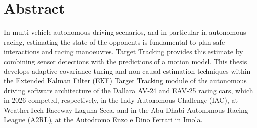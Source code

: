 \documentclass{Configuration_Files/PoliMi3i_thesis}
\begin{document}


\pagestyle{empty} %
\hypersetup{pageanchor=false} %
\frontmatter %


\startpreamble
\hypersetup{pageanchor=true}
\setcounter{page}{1} %

\chapter*{Abstract}
\begingroup\setlength{\parskip}{4pt}%

In multi-vehicle autonomous driving scenarios, and in particular in autonomous racing, estimating the state of the opponents is fundamental to plan safe interactions and racing manoeuvres. Target Tracking provides this estimate by combining sensor detections with the predictions of a motion model. This thesis develops adaptive covariance tuning and non-causal estimation techniques within the Extended Kalman Filter (EKF) Target Tracking module of the autonomous driving software architecture of the Dallara AV-24 and EAV-25 racing cars, which in 2026 competed, respectively, in the Indy Autonomous Challenge (IAC), at WeatherTech Raceway Laguna Seca, and in the Abu Dhabi Autonomous Racing League (A2RL), at the Autodromo Enzo e Dino Ferrari in Imola.
\end{document}
